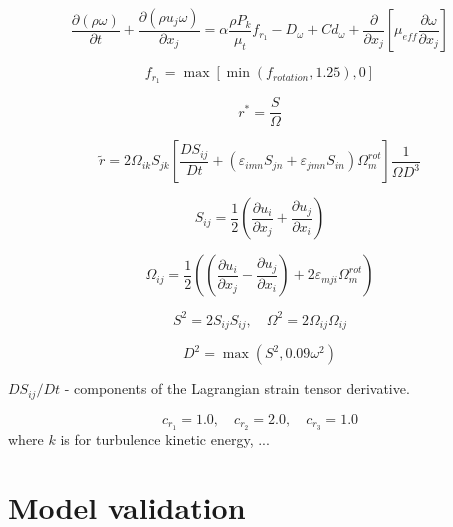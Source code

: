 \documentclass[a4paper]{jpconf}
\begin{document}
\begin{figure}[h]
\begin{minipage}{20pc}
\begin{equation}
\frac{\partial (\rho \omega)}{\partial t} + \frac{\partial (\rho u_j \omega)}{\partial x_j} = \alpha \frac{\rho P_k}{\mu_t}f_{r_1}  - D_{\omega} + Cd_{\omega} + \frac{\partial}{\partial x_j} \left[ \mu_{eff}\frac{\partial \omega}{\partial x_j} \right]
\end{equation}

\begin{equation}
f_{r_1} = \max\left[ \min(f_{rotation}, 1.25), 0 \right]
\end{equation}

\begin{equation}
r^*=\frac{S}{\Omega}
\end{equation}

\end{minipage}
\end{figure}
\begin{equation}
\tilde{r} = 2\Omega_{ik}S_{jk}\left[ \frac{DS_{ij}}{Dt} + \left( \varepsilon_{imn}S_{jn} + \varepsilon_{jmn}S_{in} \right)\Omega^{rot}_m \right]\frac{1}{\Omega D^3}
\end{equation}

 \begin{equation}
 S_{ij} = \frac{1}{2}\left( \frac{\partial u_i}{\partial x_j} + \frac{\partial u_j}{\partial x_i} \right)
 \end{equation}

\begin{equation}
\Omega_{ij} = \frac{1}{2}\left( \left( \frac{\partial u_i}{\partial x_j} - \frac{\partial u_j}{\partial x_i}  \right) +2\varepsilon_{mji} \Omega^{rot}_m \right)
\end{equation}

\begin{equation}
S^2 = 2S_{ij}S_{ij}, \quad 
\Omega^2 = 2\Omega_{ij}\Omega_{ij}
\end{equation}

\begin{equation}
D^2 = \max(S^2, 0.09\omega^2)
\end{equation}

$DS_{ij}/Dt$ - components of the Lagrangian strain tensor derivative.

$$
c_{r_1} = 1.0, \quad c_{r_2} = 2.0, \quad c_{r_3} = 1.0
$$
 where $k$ is for turbulence kinetic energy, ... 

\section{Model validation}
\end{document}
